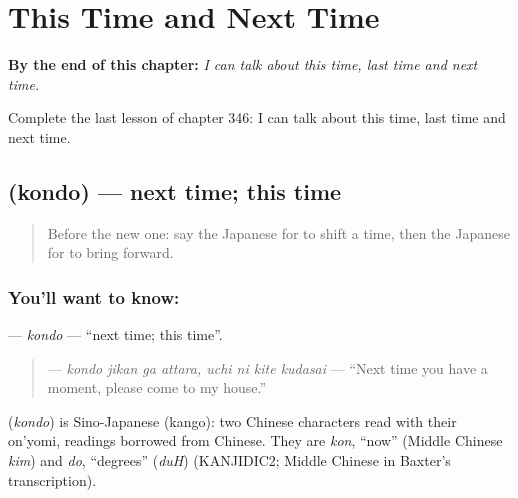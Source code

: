 
\chapter{This Time and Next Time}
\label{ch:ja-this-time-and-next-time}

\begin{chapteropening}
\textbf{By the end of this chapter:} \emph{I can talk about this time, last time and next time.}

Complete the last lesson of chapter 346: I can talk about this time, last time and next time.
\end{chapteropening}

\section[\texorpdfstring{\ja{こんど} (kondo)}{こんど (kondo)}]{ (kondo) — next time; this time}

\label{lesson:JA-C346-kondo}



\begin{quote}
Before the new one: say the Japanese for to shift a time, then the Japanese for to bring forward.
\end{quote}

\subsection*{You'll want to know: }
\textbf{} — \emph{kondo} — \textquotedblleft{}next time; this time\textquotedblright{}.

\begin{quote}
\textbf{    } — \emph{kondo jikan ga attara, uchi ni kite kudasai} — \textquotedblleft{}Next time you have a moment, please come to my house.\textquotedblright{}
\end{quote}

\begin{cousinweb}
\textbf{} (\emph{kondo}) is Sino-Japanese (kango): two Chinese characters read with their on'yomi, readings borrowed from Chinese. They are \emph{kon}, \textquotedblleft{}now\textquotedblright{} (Middle Chinese \emph{kim}) and \emph{do}, \textquotedblleft{}degrees\textquotedblright{} (\emph{duH}) (KANJIDIC2; Middle Chinese in Baxter's transcription).
\end{cousinweb}

